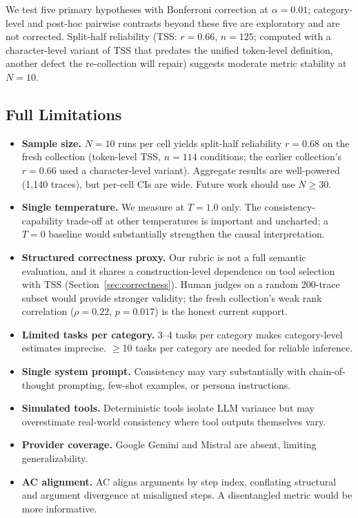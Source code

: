\documentclass[11pt]{article}
\newcommand{\tss}{\mathrm{TSS}}
\begin{document}
We test five primary hypotheses with Bonferroni correction at $\alpha = 0.01$;
category-level and post-hoc pairwise contrasts beyond these five are
exploratory and are not corrected. Split-half reliability (TSS: $r = 0.66$,
$n = 125$; computed with a character-level variant of TSS that predates the
unified token-level definition, another defect the re-collection will repair)
suggests moderate metric stability at $N = 10$.

\subsection*{Full Limitations}

\begin{itemize}[leftmargin=1.5em]
  \item \textbf{Sample size.} $N = 10$ runs per cell yields split-half
    reliability $r = 0.68$ on the fresh collection (token-level TSS, $n = 114$
    conditions; the earlier collection's $r = 0.66$ used a character-level
    variant). Aggregate results are well-powered (1,140 traces), but per-cell
    CIs are wide. Future work should use $N \geq 30$.
  \item \textbf{Single temperature.} We measure at $T = 1.0$ only. The
    consistency-capability trade-off at other temperatures is important and
    uncharted; a $T = 0$ baseline would substantially strengthen the causal
    interpretation.
  \item \textbf{Structured correctness proxy.} Our rubric is not a full
    semantic evaluation, and it shares a construction-level dependence on tool
    selection with $\tss$ (Section~\ref{sec:correctness}). Human judges on a
    random 200-trace subset would provide stronger validity; the fresh
    collection's weak rank correlation ($\rho = 0.22$, $p = 0.017$) is the
    honest current support.
  \item \textbf{Limited tasks per category.} 3--4 tasks per category makes
    category-level estimates imprecise. $\geq$10 tasks per category are needed for
    reliable inference.
  \item \textbf{Single system prompt.} Consistency may vary substantially with
    chain-of-thought prompting, few-shot examples, or persona instructions.
  \item \textbf{Simulated tools.} Deterministic tools isolate LLM variance but may
    overestimate real-world consistency where tool outputs themselves vary.
  \item \textbf{Provider coverage.} Google Gemini and Mistral are absent, limiting
    generalizability.
  \item \textbf{AC alignment.} AC aligns arguments by step index, conflating
    structural and argument divergence at misaligned steps. A disentangled metric
    would be more informative.
\end{itemize}
\end{document}
